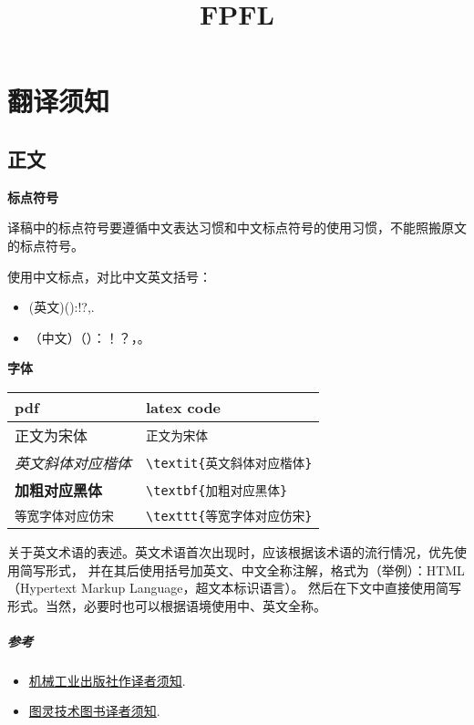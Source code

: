\documentclass{ctexbook}
\title{FPFL}
\begin{document}
\chapter{翻译须知}

\section{正文}

\textbf{标点符号}

译稿中的标点符号要遵循中文表达习惯和中文标点符号的使用习惯，不能照搬原文的标点符号。

使用中文标点，对比中文英文括号：
\begin{itemize}
    \item (英文)():!?,.
    \item （中文）（）：！？，。
\end{itemize}

\textbf{字体}

\vspace{4mm}
\begin{tabular}{ll}
    \toprule
    pdf                          &  latex code                         \\
    \midrule
    正文为宋体                   &  \verb!正文为宋体!                  \\
    \textit{英文斜体对应楷体}    &  \verb!\textit{英文斜体对应楷体}!   \\
    \textbf{加粗对应黑体}        &  \verb!\textbf{加粗对应黑体}!       \\
    \texttt{等宽字体对应仿宋}    &  \verb!\texttt{等宽字体对应仿宋}!   \\
    \bottomrule
\end{tabular}
\vspace{4mm}

关于英文术语的表述。英文术语首次出现时，应该根据该术语的流行情况，优先使用简写形式，
并在其后使用括号加英文、中文全称注解，格式为（举例）：HTML（Hypertext
Markup Language，超文本标识语言）。
然后在下文中直接使用简写形式。当然，必要时也可以根据语境使用中、英文全称。

\paragraph{参考}

\begin{itemize}
\item \href{http://www.cmpbook.com/index.php?id=131}{机械工业出版社作译者须知}.
\item \href{http://www.ituring.com.cn/article/501527}{图灵技术图书译者须知}.
\end{itemize}
\end{document}
